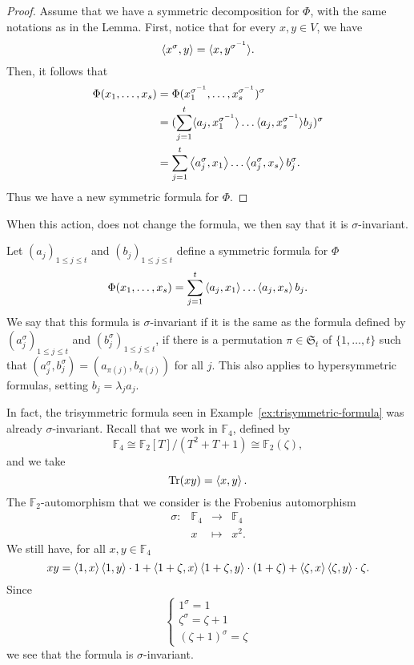 \begin{proof}
 Assume that we have a symmetric decomposition for $\Phi$, with the same
 notations as in the Lemma. First, notice that for every $x,y\in V$, we have
 \[
   \left\langle x^\sigma,y\right\rangle = \langle{x},{y^{\sigma^{-1}}}\rangle.
 \]
 Then, it follows that
 \begin{align*}
   \Phi(x_1, \dots, x_s) &= \Phi(x_1^{\sigma^{-1}}, \dots,
   x_{s}^{\sigma^{-1}})^\sigma\\
   &=
   (\sum_{j=1}^t\langle{a_j},{x_1^{\sigma^{-1}}}\rangle\dots\langle{a_j},{x_s^{\sigma^{-1}}}\rangle
   b_j)^\sigma\\
   &= \sum_{j=1}^t\left\langle a_j^{\sigma},x_1\right\rangle\dots\left\langle a_j^\sigma,x_s\right\rangle b_j^\sigma.
 \end{align*}
 Thus we have a new symmetric formula for $\Phi$.
\end{proof}
When this action, does not change the formula, we then say that it is
$\sigma$-invariant.
\begin{defi}
  Let $(a_j)_{1\leq j\leq t}$ and
$(b_j)_{1\leq j\leq t}$ define a symmetric formula for $\Phi$
  \[
    \Phi(x_1, \dots, x_s) = \sum_{j=1}^t\left\langle a_j,x_1\right\rangle\dots\left\langle a_j,x_s\right\rangle b_j.
  \]
We say that this
formula is $\sigma$-invariant if it is the same as the formula defined by
$(a_j^\sigma)_{1\leq j\leq t}$ and $(b_j^\sigma)_{1\leq j\leq t}$,
\ie if there is a permutation $\pi\in\mathfrak S_t$ of $\{1,\dots,t\}$ such that
$(a_j^\sigma,b_j^\sigma)=(a_{\pi(j)},b_{\pi(j)})$ for all $j$. This also applies
to hypersymmetric formulas, setting $b_j=\lambda_j a_j$. 
\end{defi}
\begin{ex}
  In fact, the trisymmetric formula seen in
  Example~\ref{ex:trisymmetric-formula} was already $\sigma$-invariant. Recall
  that we work in $\mathbb{F}_4$, defined by
  \[
   \mathbb{F}_4\cong\mathbb{F}_2[T]/(T^2+T+1)\cong\mathbb{F}_2(\zeta),
  \]
  and we take
\[
  \operatorname{Tr}(xy) = \left\langle x,y\right\rangle.
\]
The $\mathbb{F}_2$-automorphism that we consider is the Frobenius automorphism
\[
  \begin{array}{cccc}
    \sigma: & \mathbb{F}_4 & \to & \mathbb{F}_4 \\
    & x & \mapsto & x^2.
  \end{array}
\]
We still have, for all $x, y\in\mathbb{F}_4$
\[
  xy =
  \left\langle1,x\right\rangle\left\langle1,y\right\rangle\cdot1+\left\langle1+\zeta,x\right\rangle\left\langle1+\zeta,y\right\rangle\cdot(1+\zeta)+\left\langle\zeta,x\right\rangle\left\langle\zeta,y\right\rangle\cdot\zeta.
\]
Since
\[
\left\{ 
  \begin{array}{l}
    1^\sigma = 1 \\
    \zeta^\sigma=\zeta+1\\
    (\zeta+1)^\sigma=\zeta
  \end{array}
\right.
\]
we see that the formula is $\sigma$-invariant.
\end{ex}

